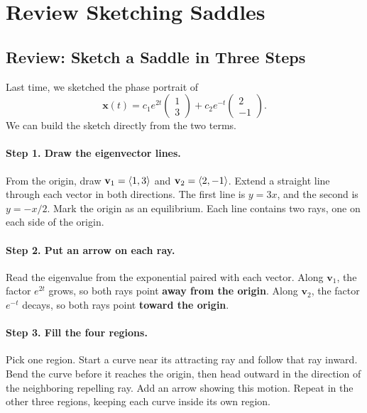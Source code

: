 \documentclass[10pt,letterpaper]{article}
\begin{document}

\section{Review Sketching Saddles}

\subsection{Review: Sketch a Saddle in Three Steps}


Last time, we sketched the phase portrait of
\[
\mathbf{x}(t)
=c_1e^{2t}\begin{pmatrix}1\\3\end{pmatrix}
+c_2e^{-t}\begin{pmatrix}2\\-1\end{pmatrix}.
\]
We can build the sketch directly from the two terms.

\paragraph{Step 1. Draw the eigenvector lines.}
From the origin, draw $\mathbf{v}_1=\left\langle 1,3\right\rangle$ and
$\mathbf{v}_2=\left\langle 2,-1\right\rangle$. Extend a straight line through each vector
in both directions. The first line is $y=3x$, and the second is $y=-x/2$.
Mark the origin as an equilibrium. Each line contains two rays, one on
each side of the origin.

\paragraph{Step 2. Put an arrow on each ray.}
Read the eigenvalue from the exponential paired with each vector.
Along $\mathbf{v}_1$, the factor $e^{2t}$ grows, so both rays point
\textbf{away from the origin}. Along $\mathbf{v}_2$, the factor $e^{-t}$
decays, so both rays point \textbf{toward the origin}.

\paragraph{Step 3. Fill the four regions.}
Pick one region. Start a curve near its attracting ray and follow that
ray inward. Bend the curve before it reaches the origin, then head
outward in the direction of the neighboring repelling ray. Add an arrow
showing this motion. Repeat in the other three regions, keeping each
curve inside its own region.
\end{document}
